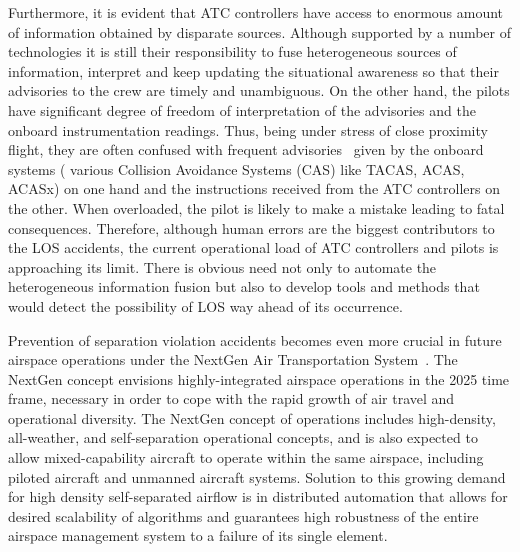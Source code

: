 \documentclass[letter,onecolumn,12pt]{aiaa-tc}
\newcommand{\1}{1_n}
\begin{document}
Furthermore, it is evident that ATC controllers have access to enormous amount of information obtained by disparate sources. Although supported by a number of technologies it is still their responsibility to fuse heterogeneous sources of information, interpret and keep updating the situational awareness so that their advisories to the crew are timely and unambiguous. On the other hand, the pilots have significant degree of freedom of interpretation of the advisories and the onboard instrumentation readings. Thus, being under stress of close proximity flight, they are often confused with frequent advisories~\cite{Kochenderfer_2012} given by the onboard systems ( various Collision Avoidance Systems (CAS) like TACAS, ACAS, ACASx) on one hand and the instructions received from the ATC controllers on the other. When overloaded, the pilot is likely to make a mistake leading to fatal consequences. Therefore, although human errors are the biggest contributors to the LOS accidents, the current operational load of ATC controllers and pilots is approaching its limit. There is obvious need not only to automate the heterogeneous information fusion but also to develop tools and methods that would detect the possibility of LOS way ahead of its occurrence.


Prevention of separation violation accidents becomes even more crucial in future airspace operations under the NextGen Air Transportation  System~\cite{NextGen_ConOps}. The NextGen concept envisions highly-integrated airspace operations in the 2025 time frame, necessary in order to cope with the rapid growth of air travel and operational diversity. The NextGen concept of operations includes high-density, all-weather, and self-separation operational concepts, and is also expected to allow mixed-capability aircraft to operate within the same airspace, including piloted aircraft and unmanned aircraft systems. Solution to this growing demand for high density self-separated airflow is in distributed automation that allows for desired scalability of algorithms and guarantees high robustness of the entire airspace management system to a failure of its single element.
\end{document}
